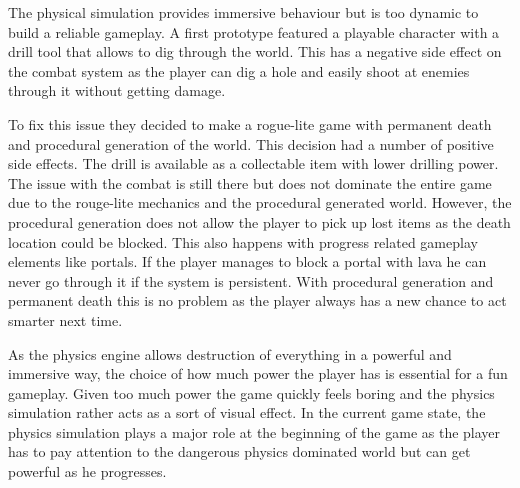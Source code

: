 \documentclass[a4paper]{article}
\begin{document}
The physical simulation provides immersive behaviour but is too dynamic to
build a reliable gameplay. 
A first prototype featured a playable character with a drill tool that allows to dig through the world. This has a negative side effect on the combat system as the player can dig a hole and easily shoot at enemies through it without getting damage.\par\noindent
To fix this issue they decided to make a rogue-lite game with permanent death and procedural generation of
the world. This decision had a number of positive side effects. 
The drill is available as a collectable item with lower drilling power. The issue with the combat is still there but does not dominate the entire game due to the rouge-lite mechanics and the procedural generated world.
However, the procedural generation does not allow the player to pick up lost items as the death location could
be blocked. This also happens with progress related gameplay elements like portals. If the player manages to block a portal with lava he can never go through it if the system is persistent. With procedural generation
and permanent death this is no problem as the player always has a new chance to act smarter next time.\par\par\noindent
As the physics engine allows destruction of everything in a powerful and immersive way, the choice
of how much power the player has is essential for a fun gameplay. Given too much power the game quickly feels boring and the physics simulation rather acts as a sort of visual effect.
In the current game state, the physics simulation plays a major role at the beginning of the game as the player has to pay attention to the dangerous physics dominated world but can get powerful as he progresses.

\end{document}
